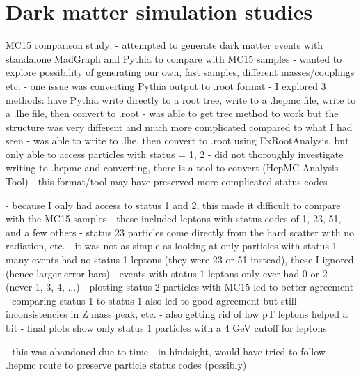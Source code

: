 \section{Dark matter simulation studies}
\label{sec:dmsim}

MC15 comparison study:
- attempted to generate dark matter events with standalone MadGraph and Pythia to compare with MC15 samples
- wanted to explore possibility of generating our own, fast samples, different masses/couplings etc.
- one issue was converting Pythia output to .root format
- I explored 3 methods: have Pythia write directly to a root tree, write to a .hepmc file, write to a .lhe file, then convert to .root
- was able to get tree method to work but the structure was very different and much more complicated compared to what I had seen
- was able to write to .lhe, then convert to .root using ExRootAnalysis, but only able to access particles with status = 1, 2
- did not thoroughly investigate writing to .hepmc and converting, there is a tool to convert (HepMC Analysis Tool)
- this format/tool may have preserved more complicated status codes

- because I only had access to status 1 and 2, this made it difficult to compare with the MC15 samples
- these included leptons with status codes of 1, 23, 51, and a few others
- status 23 particles come directly from the hard scatter with no radiation, etc.
- it was not as simple as looking at only particles with status 1
- many events had no status 1 leptons (they were 23 or 51 instead), these I ignored (hence larger error bars)
- events with status 1 leptons only ever had 0 or 2 (never 1, 3, 4, ...)
- plotting status 2 particles with MC15 led to better agreement
- comparing status 1 to status 1 also led to good agreement but still inconsistencies in Z mass peak, etc.
- also getting rid of low pT leptons helped a bit
- final plots show only status 1 particles with a 4 GeV cutoff for leptons

- this was abandoned due to time
- in hindsight, would have tried to follow .hepmc route to preserve particle status codes (possibly)